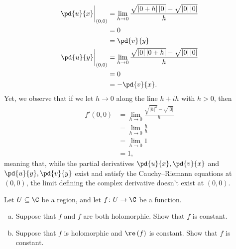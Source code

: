 \documentclass[10pt]{mypackage}
\begin{document}
\begin{solution}
\begin{enumerate}[(a)]
      \begin{align*}
        \pd{u}{x}\biggr\vert_{(0,0)} &= \lim_{h\rightarrow 0} \frac{\sqrt{\left\vert 0+h \right\vert\left\vert 0 \right\vert} - \sqrt{\left\vert 0 \right\vert\left\vert 0 \right\vert}}{h}\\
                                     &= 0\\
                                     &= \pd{v}{y}\\
        \pd{u}{y}\biggr\vert_{(0,0)} &= \lim_{h\rightarrow 0} \frac{\sqrt{\left\vert 0 \right\vert\left\vert 0 + h \right\vert} - \sqrt{\left\vert 0 \right\vert\left\vert 0 \right\vert}}{ h }\\
                                     &= 0\\
                                     &= -\pd{v}{x}.
      \end{align*}
      Yet, we observe that if we let $h\rightarrow 0$ along the line $ h + ih $ with $h > 0$, then
      \begin{align*}
        f'\left( 0,0 \right) &= \lim_{h\rightarrow 0} \frac{ \sqrt{\left\vert h \right\vert^2} - \sqrt{\left\vert 0 \right\vert} }{h}\\
                             &= \lim_{h\rightarrow 0} \frac{h}{h}\\
                             &= \lim_{h\rightarrow 0} 1\\
                             &= 1,
      \end{align*}
      meaning that, while the partial derivatives $ \pd{u}{x}, \pd{v}{x} $ and $ \pd{u}{y}, \pd{v}{y}$ exist and satisfy the Cauchy--Riemann equations at $ \left( 0,0 \right) $, the limit defining the complex derivative doesn't exist at $\left( 0,0 \right)$.
  \end{enumerate}
\end{solution}
\begin{problem}[Problem 2]
  Let $U\subseteq \C$ be a region, and let $f\colon U\rightarrow \C$ be a function.
  \begin{enumerate}[(a)]
    \item Suppose that $f$ and $ \overline{f} $ are both holomorphic. Show that $f$ is constant.
    \item Suppose that $f$ is holomorphic and $\re\left( f \right)$ is constant. Show that $f$ is constant.
  \end{enumerate}
\end{problem}
\end{document}
